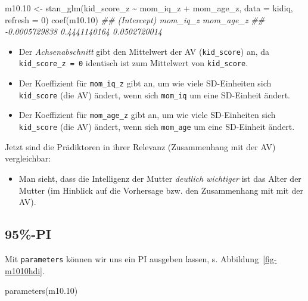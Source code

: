 \documentclass[
  a4paper,
  DIV=11]{scrreprt}
\newenvironment{Shaded}{\begin{snugshade}}{\end{snugshade}}
\newcommand{\AttributeTok}[1]{\textcolor[rgb]{0.40,0.45,0.13}{#1}}
\newcommand{\DecValTok}[1]{\textcolor[rgb]{0.68,0.00,0.00}{#1}}
\newcommand{\DocumentationTok}[1]{\textcolor[rgb]{0.37,0.37,0.37}{\textit{#1}}}
\newcommand{\FloatTok}[1]{\textcolor[rgb]{0.68,0.00,0.00}{#1}}
\newcommand{\FunctionTok}[1]{\textcolor[rgb]{0.28,0.35,0.67}{#1}}
\newcommand{\NormalTok}[1]{\textcolor[rgb]{0.00,0.23,0.31}{#1}}
\newcommand{\OtherTok}[1]{\textcolor[rgb]{0.00,0.23,0.31}{#1}}
\newcommand{\SpecialCharTok}[1]{\textcolor[rgb]{0.37,0.37,0.37}{#1}}
\providecommand{\tightlist}{%
  \setlength{\itemsep}{0pt}\setlength{\parskip}{0pt}}\usepackage{longtable,booktabs,array}
\theoremstyle{definition}
\theoremstyle{remark}
\begin{document}
\begin{Shaded}
\begin{Highlighting}[]
\NormalTok{m10}\FloatTok{.10} \OtherTok{\textless{}{-}} \FunctionTok{stan\_glm}\NormalTok{(kid\_score\_z }\SpecialCharTok{\textasciitilde{}}\NormalTok{ mom\_iq\_z }\SpecialCharTok{+}\NormalTok{ mom\_age\_z, }\AttributeTok{data =}\NormalTok{ kidiq, }\AttributeTok{refresh =} \DecValTok{0}\NormalTok{)}
\FunctionTok{coef}\NormalTok{(m10}\FloatTok{.10}\NormalTok{)}
\DocumentationTok{\#\#   (Intercept)      mom\_iq\_z     mom\_age\_z }
\DocumentationTok{\#\# {-}0.0005729838  0.4441140164  0.0502720014}
\end{Highlighting}
\end{Shaded}

\begin{itemize}
\tightlist
\item
  Der \emph{Achsenabschnitt} gibt den Mittelwert der AV
  (\texttt{kid\_score}) an, da \texttt{kid\_score\_z\ =\ 0} identisch
  ist zum Mittelwert von \texttt{kid\_score}.
\item
  Der Koeffizient für \texttt{mom\_iq\_z} gibt an, um wie viele
  SD-Einheiten sich \texttt{kid\_score} (die AV) ändert, wenn sich
  \texttt{mom\_iq} um eine SD-Einheit ändert.
\item
  Der Koeffizient für \texttt{mom\_age\_z} gibt an, um wie viele
  SD-Einheiten sich \texttt{kid\_score} (die AV) ändert, wenn sich
  \texttt{mom\_age} um eine SD-Einheit ändert.
\end{itemize}

Jetzt sind die Prädiktoren in ihrer Relevanz (Zusammenhang mit der AV)
vergleichbar:

\begin{itemize}
\tightlist
\item
  Man sieht, dass die Intelligenz der Mutter \emph{deutlich wichtiger}
  ist das Alter der Mutter (im Hinblick auf die Vorhersage bzw. den
  Zusammenhang mit mit der AV).
\end{itemize}

\hypertarget{pi}{%
\subsection{95\%-PI}\label{pi}}

Mit \texttt{parameters} können wir uns ein PI ausgeben lassen, s.
Abbildung~\ref{fig-m1010hdi}.

\begin{Shaded}
\begin{Highlighting}[]
\FunctionTok{parameters}\NormalTok{(m10}\FloatTok{.10}\NormalTok{) }
\end{Highlighting}
\end{Shaded}
\end{document}
